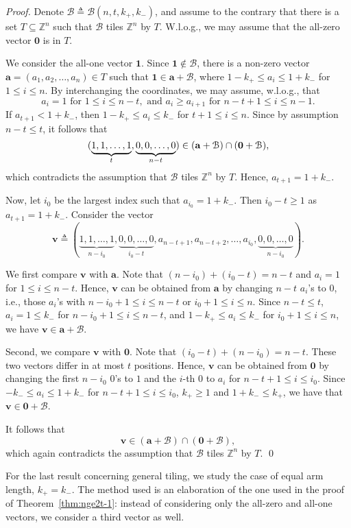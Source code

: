 \documentclass[sort&compress]{elsarticle}
\DeclarePairedDelimiter\parenv{\lparen}{\rparen}
\newcommand{\cB}{\mathcal{B}}
\renewcommand{\leq}{\leqslant}
\renewcommand{\geq}{\geqslant}
\newcommand{\Z}{\mathbb{Z}}
\newcommand{\vv}{\mathbf{v}}
\newcommand{\va}{\mathbf{a}}
\newcommand{\Zero}{{\mathbf{0}}}
\newcommand{\One}{{\mathbf{1}}}
\newcommand{\kp}{k_+}
\newcommand{\km}{k_-}
\newcommand{\BALL}{{\mathcal B}(n,t,\kp,\km)}
\begin{document}
\begin{proof}
  Denote $\cB \triangleq \BALL$, and assume to the contrary that there
  is a set $T\subseteq \Z^n$ such that $\cB$ tiles $\Z^n$ by
  $T$. W.l.o.g., we may assume that the all-zero vector $\Zero$ is in
  $T$.

  We consider the all-one vector $\One$. Since $\One \not \in \cB$,
  there is a non-zero vector $\va=(a_1,a_2,\ldots, a_n) \in T$ such
  that $\One\in\va+\cB$, where $1-\kp\leq a_i \leq 1+\km$ for $1\leq
  i\leq n$.  By interchanging the coordinates, we may assume,
  w.l.o.g., that
  \[a_i=1 \text{\ for }1\leq i\leq n-t, \text{\ and\ } a_i \geq a_{i+1} \text{ for } n-t+1 \leq i \leq n-1.\]
  If $a_{t+1} <1+\km$, then $1-\kp\leq a_i \leq \km$ for $t+1 \leq i
  \leq n$. Since by assumption $n-t\leq t$, it follows
  that
  \[(\underbrace{1,1,\ldots, 1}_{t}, \underbrace{0,0,
    \ldots,0}_{n-t}) \in \parenv*{ \va + \cB } \cap \parenv*{
    \Zero+\cB },\]
  which contradicts the assumption that $\cB$ tiles $\Z^n$ by
  $T$. Hence, $a_{t+1}=1+\km$.

  Now, let $i_0$ be the largest index such that $a_{i_0}=1+\km$. Then
  $i_0-t\geq 1$ as $a_{t+1}=1+\km$. Consider the vector 
  \[\vv\triangleq (\underbrace{1,1,\ldots, 1}_{n-i_0}, \underbrace{0,0,\ldots, 0}_{i_0-t}, a_{n-t+1}, a_{n-t+2}, \ldots, a_{i_0}, \underbrace{0,0,\ldots, 0}_{n-i_0}).\]

  We first compare $\vv$ with $\va$.  Note that $(n-i_0)+(i_0-t)= n-t$
  and $a_i=1$ for $1 \leq i \leq n-t$. Hence, $\vv$ can be obtained
  from $\va$ by changing $n-t$ $a_i$'s to $0$, i.e., those $a_i$'s
  with $n-i_0+1 \leq i \leq n-t$ or $i_0+1 \leq i \leq n$.  Since
  $n-t\leq t$, $a_i=1\leq \km$ for $n-i_0+1 \leq i \leq n-t$, and
  $1-\kp\leq a_i \leq \km$ for $i_0+1 \leq i\leq n$, we have $\vv \in
  \va+\cB$.
  
  Second, we compare $\vv$ with $\Zero$. Note that
  $(i_0-t)+(n-i_0)=n-t$. These two vectors differ in at most $t$
  positions. Hence, $\vv$ can be obtained from $\Zero$ by changing the
  first $n-i_0$ $0$'s to $1$ and the $i$-th $0$ to $a_i$ for $n-t+1
  \leq i\leq i_0$. Since $-\km\leq a_i \leq 1+\km$ for $n-t+1 \leq
  i\leq i_0$, $\kp\geq 1$ and $1+\km \leq \kp$, we have that $\vv \in
  \Zero+\cB$.

  It follows that
  \[ \vv\in (\va+\cB)\cap(\Zero+\cB),\]
  which again contradicts the assumption that $\cB$ tiles $\Z^n$ by
  $T$.
  \qed\end{proof}

  For the last result concerning general tiling, we study the case of
  equal arm length, $\kp=\km$. The method used is an elaboration of
  the one used in the proof of Theorem~\ref{thm:nge2t-1}: instead of
  considering only the all-zero and all-one vectors, we consider a
  third vector as well.
\end{document}
